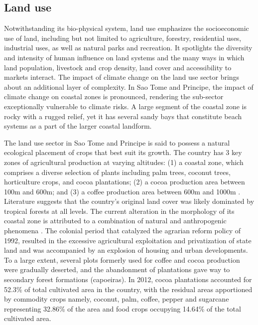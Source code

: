 \documentclass[
]{book}
\begin{document}
\hypertarget{land-use}{%
\subsection{Land use}\label{land-use}}

Notwithstanding its bio-physical system, land use emphasizes the socioeconomic use of land, including but not limited to agriculture, forestry, residential uses, industrial uses, as well as natural parks and recreation. It spotlights the diversity and intensity of human influence on land systems and the many ways in which land population, livestock and crop density, land cover and accessibility to markets interact. The impact of climate change on the land use sector brings about an additional layer of complexity. In Sao Tome and Principe, the impact of climate change on coastal zones is pronounced, rendering the sub-sector exceptionally vulnerable to climate risks. A large segment of the coastal zone is rocky with a rugged relief, yet it has several sandy bays that constitute beach systems as a part of the larger coastal landform.

The land use sector in Sao Tome and Principe is said to possess a natural ecological placement of crops that best suit its growth. The country has 3 key zones of agricultural production at varying altitudes: (1) a coastal zone, which comprises a diverse selection of plants including palm trees, coconut trees, horticulture crops, and cocoa plantations; (2) a cocoa production area between 100m and 600m; and (3) a coffee production area between 600m and 1000m . Literature suggests that the country's original land cover was likely dominated by tropical forests at all levels. The current alteration in the morphology of its coastal zone is attributed to a combination of natural and anthropogenic phenomena . The colonial period that catalyzed the agrarian reform policy of 1992, resulted in the excessive agricultural exploitation and privatization of state land and was accompanied by an explosion of housing and urban developments. To a large extent, several plots formerly used for coffee and cocoa production were gradually deserted, and the abandonment of plantations gave way to secondary forest formations (capoeiras). In 2012, cocoa plantations accounted for 52.3\% of total cultivated area in the country, with the residual areas apportioned by commodity crops namely, coconut, palm, coffee, pepper and sugarcane representing 32.86\% of the area and food crops occupying 14.64\% of the total cultivated area.
\end{document}
